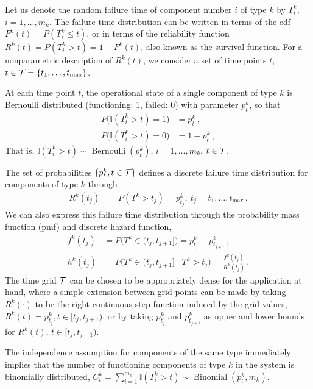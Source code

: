 \documentclass[12pt, a4paper]{elsarticle}
\newcommand{\indic}{\mathbb{I}}
\newcommand{\ber}{\operatorname{Bernoulli}}
\newcommand{\bin}{\operatorname{Binomial}}
\def\tmax{t_\text{max}}
\newcommand{\ptk}{p^k_t}
\begin{document}
Let us denote the random failure time of component number $i$ of type $k$ by $T^k_i$, $i = 1, \ldots, m_k$.
The failure time distribution can be written in terms of the cdf $F^k(t) = P(T^k_i \le t)$,
or in terms of the reliability function $R^k(t) = P(T^k_i > t) = 1 - F^k(t)$,
also known as the survival function.
For a nonparametric description of $R^k(t)$,
we consider a set of time points $t$, $t \in {\cal T} = \{t_1, \ldots, \tmax\}$.

At each time point $t$, the operational state of a single component of type $k$
is Bernoulli distributed (functioning: 1, failed: 0) with parameter $\ptk$, so that
\begin{align*}
P\big(\indic(T^k_i > t) = 1\big) &= \ptk\,, \\
P\big(\indic(T^k_i > t) = 0\big) &= 1 - \ptk\,,
\end{align*}
That is, $\indic(T^k_i > t) \sim \ber(\ptk)$, $i = 1, \ldots, m_k$, $t \in {\cal T}$.

The set of probabilities $\{ \ptk, t \in {\cal T}\}$
defines a discrete failure time distribution for components of type $k$ through
\begin{align*}
R^k(t_j) &= P(T^k > t_j) = p^k_{t_j},\ t_j = t_1, \ldots, \tmax\,.
\end{align*}
We can also express this failure time distribution through the probability mass function (pmf) and discrete hazard function,
\begin{align*}
f^k(t_j) &= P\big(T^k \in (t_j,t_{j+1}]\big) = p^k_{t_j} - p^k_{t_{j+1}}\,,\\ 
h^k(t_j) &= P\big(T^k \in (t_j,t_{j+1}]\mid T^k > t_j\big) = \frac{f^k(t_j)}{R^k(t_j)}\,. %
\end{align*}
The time grid $\cal T$ can be chosen to be appropriately dense for the application at hand,
where a simple extension between grid points can be made by taking $R^k(\cdot)$ to be the right continuous step function induced by the grid values,
$R^k(t) = p^k_{t_j}, t \in [t_j, t_{j+1})$,
or by taking $p^k_{t_j}$ and $p^k_{t_{j+1}}$ as upper and lower bounds for $R^k(t)$, $t \in [t_j, t_{j+1})$.

The independence assumption for components of the same type immediately implies that 
the number of functioning components of type $k$ in the system
is binomially distributed, $C^k_t = \sum_{i=1}^{m_k} \indic(T^k_i > t) \sim \bin(\ptk, m_k)$.
\end{document}
